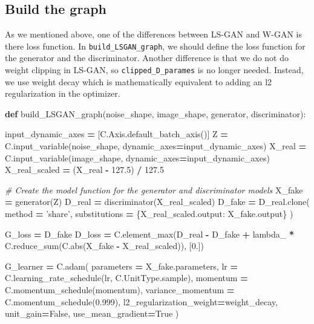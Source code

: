 \documentclass[]{book}
\newenvironment{Shaded}{\begin{snugshade}}{\end{snugshade}}
\newcommand{\KeywordTok}[1]{\textcolor[rgb]{0.13,0.29,0.53}{\textbf{#1}}}
\newcommand{\DecValTok}[1]{\textcolor[rgb]{0.00,0.00,0.81}{#1}}
\newcommand{\FloatTok}[1]{\textcolor[rgb]{0.00,0.00,0.81}{#1}}
\newcommand{\StringTok}[1]{\textcolor[rgb]{0.31,0.60,0.02}{#1}}
\newcommand{\CommentTok}[1]{\textcolor[rgb]{0.56,0.35,0.01}{\textit{#1}}}
\newcommand{\VariableTok}[1]{\textcolor[rgb]{0.00,0.00,0.00}{#1}}
\newcommand{\OperatorTok}[1]{\textcolor[rgb]{0.81,0.36,0.00}{\textbf{#1}}}
\newcommand{\BuiltInTok}[1]{#1}
\newcommand{\NormalTok}[1]{#1}
\theoremstyle{definition}
\theoremstyle{definition}
\theoremstyle{definition}
\theoremstyle{remark}
\begin{document}
\subsection{Build the graph}\label{build-the-graph-1}

As we mentioned above, one of the differences between LS-GAN and W-GAN
is there loss function. In \texttt{build\_LSGAN\_graph}, we should
define the loss function for the generator and the discriminator.
Another difference is that we do not do weight clipping in LS-GAN, so
\texttt{clipped\_D\_parames} is no longer needed. Instead, we use weight
decay which is mathematically equivalent to adding an l2 regularization
in the optimizer.

\begin{Shaded}
\begin{Highlighting}[]
\KeywordTok{def}\NormalTok{ build_LSGAN_graph(noise_shape, image_shape, generator, discriminator):}
    
\NormalTok{    input_dynamic_axes }\OperatorTok{=}\NormalTok{ [C.Axis.default_batch_axis()]}
\NormalTok{    Z }\OperatorTok{=}\NormalTok{ C.input_variable(noise_shape, dynamic_axes}\OperatorTok{=}\NormalTok{input_dynamic_axes)}
\NormalTok{    X_real }\OperatorTok{=}\NormalTok{ C.input_variable(image_shape, dynamic_axes}\OperatorTok{=}\NormalTok{input_dynamic_axes)}
\NormalTok{    X_real_scaled }\OperatorTok{=}\NormalTok{ (X_real }\OperatorTok{-} \FloatTok{127.5}\NormalTok{) }\OperatorTok{/} \FloatTok{127.5}

    \CommentTok{# Create the model function for the generator and discriminator models}
\NormalTok{    X_fake }\OperatorTok{=}\NormalTok{ generator(Z)}
\NormalTok{    D_real }\OperatorTok{=}\NormalTok{ discriminator(X_real_scaled)}
\NormalTok{    D_fake }\OperatorTok{=}\NormalTok{ D_real.clone(}
\NormalTok{        method }\OperatorTok{=} \StringTok{'share'}\NormalTok{,}
\NormalTok{        substitutions }\OperatorTok{=}\NormalTok{ \{X_real_scaled.output: X_fake.output\}}
\NormalTok{    )}
    
\NormalTok{    G_loss }\OperatorTok{=}\NormalTok{ D_fake}
\NormalTok{    D_loss }\OperatorTok{=}\NormalTok{ C.element_max(D_real }\OperatorTok{-}\NormalTok{ D_fake }\OperatorTok{+}\NormalTok{ lambda_ }\OperatorTok{*}\NormalTok{ C.reduce_sum(C.}\BuiltInTok{abs}\NormalTok{(X_fake }\OperatorTok{-}\NormalTok{ X_real_scaled)), [}\DecValTok{0}\NormalTok{.])}
    
\NormalTok{    G_learner }\OperatorTok{=}\NormalTok{ C.adam(}
\NormalTok{            parameters }\OperatorTok{=}\NormalTok{ X_fake.parameters,}
\NormalTok{            lr }\OperatorTok{=}\NormalTok{ C.learning_rate_schedule(lr, C.UnitType.sample),}
\NormalTok{            momentum }\OperatorTok{=}\NormalTok{ C.momentum_schedule(momentum),}
\NormalTok{            variance_momentum }\OperatorTok{=}\NormalTok{ C.momentum_schedule(}\FloatTok{0.999}\NormalTok{),}
\NormalTok{            l2_regularization_weight}\OperatorTok{=}\NormalTok{weight_decay,}
\NormalTok{            unit_gain}\OperatorTok{=}\VariableTok{False}\NormalTok{,}
\NormalTok{            use_mean_gradient}\OperatorTok{=}\VariableTok{True}
\NormalTok{    )}
            

\end{Highlighting}
\end{Shaded}
\end{document}

